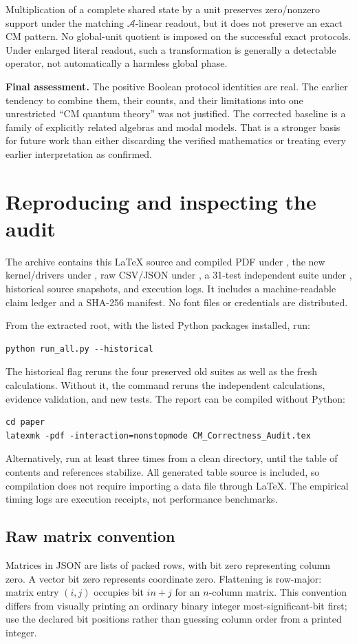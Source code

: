 \documentclass[11pt,a4paper]{article}
\theoremstyle{definition}\newtheorem{definition}[theorem]{Definition}
\newcommand{\A}{\mathcal A}
\newcommand{\file}[1]{\path{#1}}
\begin{document}
Multiplication of a complete shared state by a unit preserves zero/nonzero support under the matching $\A$-linear readout, but it does not preserve an exact CM pattern. No global-unit quotient is imposed on the successful exact protocols. Under enlarged literal readout, such a transformation is generally a detectable operator, not automatically a harmless global phase.

\textbf{Final assessment.} The positive Boolean protocol identities are real. The earlier tendency to combine them, their counts, and their limitations into one unrestricted ``CM quantum theory'' was not justified. The corrected baseline is a family of explicitly related algebras and modal models. That is a stronger basis for future work than either discarding the verified mathematics or treating every earlier interpretation as confirmed.

\appendix
\section{Reproducing and inspecting the audit}
The archive contains this LaTeX source and compiled PDF under \file{paper/}, the new kernel/drivers under \file{code/}, raw CSV/JSON under \file{data/}, a 31-test independent suite under \file{tests/}, historical source snapshots, and execution logs. It includes a machine-readable claim ledger and a SHA-256 manifest. No font files or credentials are distributed.

From the extracted root, with the listed Python packages installed, run:
\begin{verbatim}
python run_all.py --historical
\end{verbatim}
The historical flag reruns the four preserved old suites as well as the fresh calculations. Without it, the command reruns the independent calculations, evidence validation, and new tests. The report can be compiled without Python:
\begin{verbatim}
cd paper
latexmk -pdf -interaction=nonstopmode CM_Correctness_Audit.tex
\end{verbatim}
Alternatively, run \file{pdflatex} at least three times from a clean directory, until the table of contents and references stabilize. All generated table source is included, so compilation does not require importing a data file through LaTeX. The empirical timing logs are execution receipts, not performance benchmarks.

\subsection{Raw matrix convention}
Matrices in JSON are lists of packed rows, with bit zero representing column zero. A vector bit zero represents coordinate zero. Flattening is row-major: matrix entry $(i,j)$ occupies bit $i n+j$ for an $n$-column matrix. This convention differs from visually printing an ordinary binary integer most-significant-bit first; use the declared bit positions rather than guessing column order from a printed integer.
\end{document}

